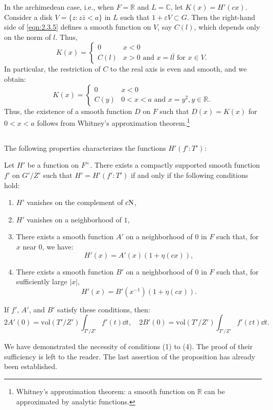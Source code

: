 In the archimedean case, i.e., when $F = \mathbb{R}$ and $L = \mathbb{C}$, let $K(x) = H'(cx)$. Consider a disk $V = \{ z : z \bar{z} < a \}$ in $L$ such that $1 + \varepsilon V \subset G$. Then the right-hand side of \eqref{eqn:2.3.5} defines a smooth function on $V$, say $C(l)$, which depends only on the norm of $l$. Thus,
\[
K(x) = \begin{cases} 0 & x < 0 \\ C(l) & x > 0 \text{ and } x = l \bar{l} \text{ for } x \in V.\end{cases}
\]
In particular, the restriction of $C$ to the real axis is even and smooth, and we obtain:
\[
K(x) = \begin{cases} 0 & x < 0 \\ C(y) & 0 <x < a\text{ and } x = y^2, y \in \mathbb{R}. \end{cases}
\]
Thus, the existence of a smooth function $D$ on $F$ such that $D(x) = K(x)$ for $0 < x < a$ follows from Whitney's approximation theorem.\footnote{Whitney's approximation theorem: a smooth function on $\mathbb{R}$ can be approximated by analytic functions.}

\subsection{}
The following properties characterizes the functions $H'(f':T')$:
\begin{proposition}\label{prop:2.1}
Let $H'$ be a function on $F^\times$. There exists a compactly supported smooth function $f'$ on $G'/Z'$ such that $H' = H'(f':T')$ if and only if the following conditions hold:
\begin{enumerate}[label=(\arabic*)]
    \item $H'$ vanishes on the complement of $c\mathrm{N}$,
    \item $H'$ vanishes on a neighborhood of $1$,
    \item There exists a smooth function $A'$ on a neighborhood of $0$ in $F$ such that, for $x$ near 0, we have:
    \[
    H'(x) = A'(x) (1 + \eta(cx)),
    \]
    \item There exists a smooth function $B'$ on a neighborhood of $0$ in $F$ such that, for sufficiently large $|x|$,
    \[
    H'(x) = B'(x^{-1}) (1 + \eta(cx)).
    \]
\end{enumerate}
If $f'$, $A'$, and $B'$ satisfy these conditions, then: 
\[
2A'(0) = \mathrm{vol}(T'/Z') \int_{T'/Z'} f'(t) \dd t, \quad 2B'(0) = \mathrm{vol}(T'/Z') \int_{T'/Z'} f'(\varepsilon t) \dd t.
\]
\end{proposition}
We have demonstrated the necessity of conditions (1) to (4).
The proof of their sufficiency is left to the reader.
The last assertion of the proposition has already been established.
